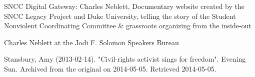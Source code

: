SNCC Digital Gateway: Charles Neblett, Documentary website created by
the SNCC Legacy Project and Duke University, telling the story of the
Student Nonviolent Coordinating Committee \& grassroots organizing from
the inside-out

Charles Neblett at the Jodi F. Solomon Speakers Bureau

Stansbury, Amy (2013-02-14). "Civil-rights activist sings for freedom".
Evening Sun. Archived from the original on 2014-05-05. Retrieved
2014-05-05.
